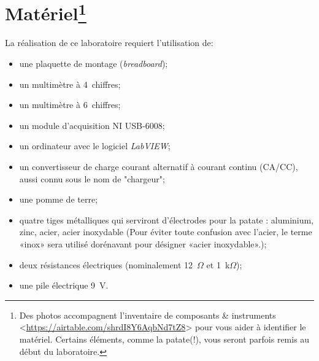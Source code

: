 \documentclass[canadien,12pt,oneside,letterpaper]{article}
\begin{document}


\section[Matériel]{Matériel\footnote{Des photos accompagnent l'inventaire de composants \& instruments <\url{https://airtable.com/shrdI8Y6AqbNd7tZ8}> pour vous aider à identifier le matériel. Certains éléments, comme la patate(!), vous seront parfois remis au début du laboratoire.}} \label{sec:mat}

\noindent La réalisation de ce laboratoire requiert l'utilisation de:
\vspace{1ex}
\begin{itemize} \itemsep5pt
\item une plaquette de montage (\textit{breadboard});
\item un multimètre à 4\textonehalf~chiffres;
\item un multimètre à 6\textonehalf~chiffres;
\item un module d'acquisition NI USB-6008;
\item un ordinateur avec le logiciel \textit{LabVIEW};
\item un convertisseur de charge courant alternatif à courant continu (CA/CC), aussi connu sous le nom de "chargeur";
\item une pomme de terre;
\item quatre tiges métalliques qui serviront d'électrodes pour la patate : aluminium, zinc, acier, acier inoxydable (Pour éviter toute confusion avec l'acier, le terme «inox» sera utilisé dorénavant pour désigner «acier inoxydable».);
\item deux résistances électriques (nominalement 12~$\Omega$ et 1~k$\Omega$);
\item une pile électrique 9~V.
\end{itemize}
\end{document}
